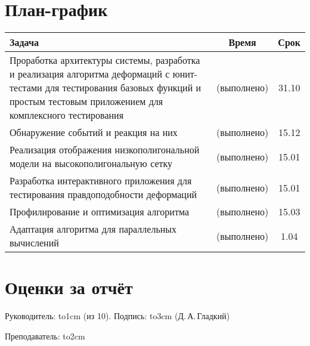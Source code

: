 \documentclass[a4paper, 14pt, titlepage]{extarticle}
\newcommand{\underscore}[1]{\hbox to#1{\hrulefill}}
\let\oldsection\section
\renewcommand{\section}{\newpage\oldsection}
\begin{document}
  \section{План-график}

    \begin{center}
      \begin{tabular}{|p{10.3cm}|c|c|}\hline
        Задача                                       & Время         & Срок  \\\hline\hline
        Проработка архитектуры системы, разработка и реализация алгоритма деформаций
        с юнит-тестами для тестирования базовых функций и простым тестовым приложением
        для комплексного тестирования                & (выполнено)   & 31.10 \\\hline
        Обнаружение событий и реакция на них         & (выполнено)   & 15.12 \\\hline
        Реализация отображения низкополигональной
        модели на высокополигональную сетку          & (выполнено)   & 15.01 \\\hline
        Разработка интерактивного приложения для
        тестирования правдоподобности деформаций     & (выполнено)   & 15.01 \\\hline
        Профилирование и оптимизация алгоритма       & (выполнено)   & 15.03 \\\hline
        Адаптация алгоритма для параллельных
        вычислений                                   & (выполнено)   & 1.04 \\\hline
      \end{tabular}
    \end{center}

  \section{Оценки за отчёт}

    Руководитель: \underscore{1cm} (из 10). Подпись: \underscore{3cm} (Д.\,А.\,Гладкий)

    \vspace{0.5cm}
    Преподаватель: \underscore{2cm}


  \begin{flushleft}
    
  \end{flushleft}
\end{document}
